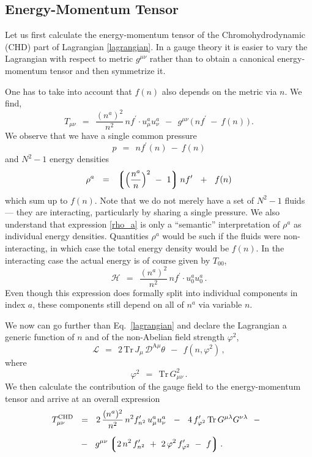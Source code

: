 \documentclass[epsfig,12pt]{article}
\def\beq{\begin{equation}}
\def\eeq{\end{equation}}
\newcommand{\mc}[1]{\mathcal{#1}}
\newcommand{\md}{\mathcal{D}}
\newcommand{\ml}{\mathcal{L}}
\newcommand{\lgr}{\left\lgroup}
\newcommand{\rgr}{\right\rgroup}
\newcommand{\Tr}{\text{Tr}}
\begin{document}
\subsection{Energy-Momentum Tensor}
	Let us first calculate the energy-momentum tensor of the Chromohydrodynamic (CHD) part of Lagrangian \eqref{lagrangian}.
	In a gauge theory it is easier to vary the Lagrangian with respect to metric $ g^{\mu\nu} $ rather than to obtain
	a canonical energy-momentum tensor and then symmetrize it.

	One has to take into account that $ f(n) $ also depends on the metric via $ n $.
	We find,
\beq
\label{emtensor}
	T_{\mu\nu}    ~~=~~
				\frac{(n^a)^2}{n^2}\, n f^\prime \cdot u_\mu^a u_\nu^a  ~~-~~
				g^{\mu\nu}\, \big(\, n f^\prime ~-~ f(n) \,\big)\,.
\eeq
	We observe that we have a single common pressure
\beq
	p    ~~=~~    n f^\prime(n) ~-~ f(n)
\eeq
	and $ N^2 - 1 $ energy densities
\beq
\label{rho_a}
	\rho^a    ~~=~~    \lgr \Big( \frac{n^a}{n} \Big)^2 ~-~ 1 \rgr n f^\prime  ~~+~~ f(n)
\eeq
	which sum up to $ f(n) $.
        Note that we do not merely have a set of $ N ^2- 1 $ fluids --- they are interacting,
        particularly by sharing a single pressure.
	We also understand that expression \eqref{rho_a} is only a ``semantic'' interpretation of $ \rho^a $
        as individual energy densities.
	Quantities $ \rho^a $ would be such if the fluids were non-interacting, in which case
	the total energy density would be $ f(n) $.
	In the interacting case the actual energy is of course given by $ T_{00} $,
\beq
	\mc{H}    ~~=~~    \frac{(n^a)^2}{n^2}\, n f^\prime \cdot u_0^a u_0^a\,.
\eeq
	Even though this expression does formally split into individual components in index $ a $,
	these components still depend on all of $ n^a $ via variable $ n $.

        We now can go further than Eq.~\eqref{lagrangian} and declare the Lagrangian
        a generic function of $ n $ and of the non-Abelian field strength $ \varphi^2 $,
\beq
\label{generic}
        \ml    ~~=~~    2\, \Tr\, J_\mu\,  \md^{\text{A}\mu} \theta   ~~-~~  f(n, \varphi^2)\,,
\eeq
        where
\beq
        \varphi^2    ~~=~~    \Tr\, G_{\mu\nu}^2\,.
\eeq
	We then calculate the contribution of the gauge field to the energy-momentum tensor and arrive
	at an overall expression
\begin{align}
\notag
	T_{\mu\nu}^\text{CHD}   & 
			~~=~~
				2\, \frac{(n^a)^2}{n^2}\, n^2 f_{n^2}^\prime\, u_\mu^a u_\nu^a  ~~-~~
				4\, f_{\varphi^2}^\prime\, \Tr\, G^{\mu\lambda} G^{\nu\lambda}  ~~-~~
	\\[2mm]
\label{TCHD}
	& 
			~~-~~
				g^{\mu\nu} \lgr 2\, n^2\, f_{n^2}^\prime  ~+~  2\, \varphi^2\, f_{\varphi^2}^\prime  ~-~  f \rgr .
\end{align}
\end{document}
